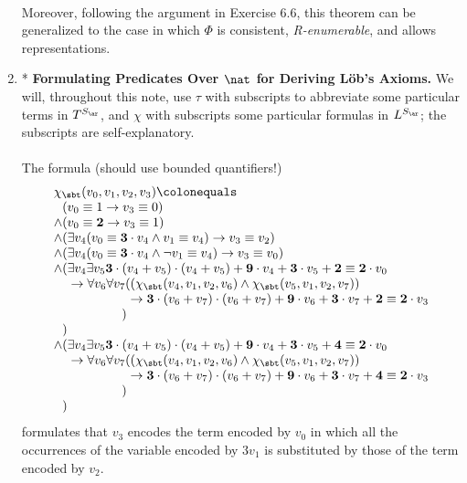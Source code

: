 \begin{enumerate}[1.]
\ \\
Moreover, following the argument in Exercise 6.6, this theorem can be generalized to the case in which $\Phi$ is consistent, \emph{R-enumerable}, and allows representations.
%
\item* \textbf{Formulating Predicates Over $\nat$ for Deriving L\"{o}b's Axioms.} We will, throughout this note, use $\tau$ with subscripts to abbreviate some particular terms in $T^{S_\ar}$, and $\chi$ with subscripts some particular formulas in $L^{S_\ar}$; the subscripts are self-explanatory.\\
\ \\
The formula (should use bounded quantifiers!)
\[
\begin{array}{l}
\chi_\sbt (v_0, v_1, v_2, v_3) \colonequals \cr
\phantom{\land} (v_0 \equiv 1 \rightarrow v_3 \equiv 0) \cr
\land (v_0 \equiv \mathbf{2} \rightarrow v_3 \equiv 1) \cr
\land (\exists v_4(v_0 \equiv \mathbf{3} \cdot v_4  \land v_1 \equiv v_4) \rightarrow v_3 \equiv v_2) \cr
\land (\exists v_4(v_0 \equiv \mathbf{3} \cdot v_4 \land \neg v_1 \equiv v_4) \rightarrow v_3 \equiv v_0) \cr
\land (\exists v_4 \exists v_5 \mathbf{3} \cdot (v_4 + v_5) \cdot (v_4 + v_5) + \mathbf{9} \cdot v_4 + \mathbf{3} \cdot v_5 + \mathbf{2} \equiv \mathbf{2} \cdot v_0 \cr
\phantom{\land(} \rightarrow \forall v_6 \forall v_7 ((\chi_\sbt (v_4, v_1, v_2, v_6) \land \chi_\sbt (v_5, v_1, v_2, v_7)) \cr
\phantom{\land(\rightarrow \forall v_6 \forall v_7)} \rightarrow \mathbf{3} \cdot (v_6 + v_7) \cdot (v_6 + v_7) + \mathbf{9} \cdot v_6 + \mathbf{3} \cdot v_7 + \mathbf{2} \equiv \mathbf{2} \cdot v_3 \cr
\phantom{\land(\rightarrow \forall v_6 \forall v_7} ) \cr
\phantom{\land} ) \cr
\land (\exists v_4 \exists v_5 \mathbf{3} \cdot (v_4 + v_5) \cdot (v_4 + v_5) + \mathbf{9} \cdot v_4 + \mathbf{3} \cdot v_5 + \mathbf{4} \equiv \mathbf{2} \cdot v_0 \cr
\phantom{\land(} \rightarrow \forall v_6 \forall v_7 ((\chi_\sbt (v_4, v_1, v_2, v_6) \land \chi_\sbt (v_5, v_1, v_2, v_7)) \cr
\phantom{\land(\rightarrow \forall v_6 \forall v_7)} \rightarrow 
\mathbf{3} \cdot (v_6 + v_7) \cdot (v_6 + v_7) + \mathbf{9} \cdot v_6 + \mathbf{3} \cdot v_7 + \mathbf{4} \equiv \mathbf{2} \cdot v_3 \cr
\phantom{\land(\rightarrow \forall v_6 \forall v_7} ) \cr
\phantom{\land} )
\end{array}
\]
formulates that $v_3$ encodes the term encoded by $v_0$ in which all the occurrences of the variable encoded by $3v_1$ is substituted by those of the term encoded by $v_2$.\\
\ \\

\end{enumerate}
